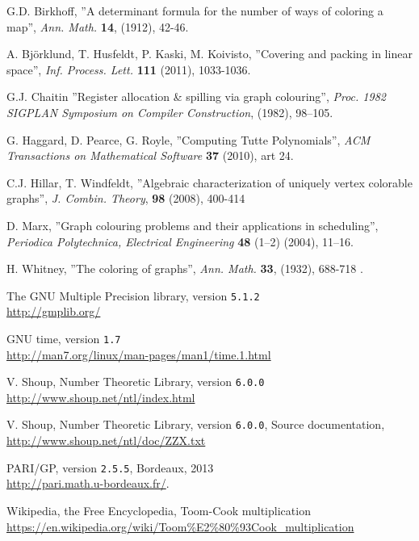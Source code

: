 \documentclass[a4paper]{article}
\newcommand{\code}{\texttt}
\begin{document}
\newpage
\begin{thebibliography}{9}
 G.D. Birkhoff, ''A determinant formula for the number of ways of coloring a map'', \textit{Ann. Math.} \textbf{14}, (1912), 42-46.

 A. Björklund, T. Husfeldt, P. Kaski, M. Koivisto, ''Covering and packing in linear space'', \textit{Inf. Process. Lett.} \textbf{111} (2011), 1033-1036.%

 G.J. Chaitin ''Register allocation \& spilling via graph colouring'', \textit{Proc. 1982 SIGPLAN Symposium on Compiler Construction}, (1982), 98–105.

 G. Haggard, D. Pearce, G. Royle, ''Computing Tutte Polynomials'', \textit{ACM Transactions on Mathematical Software} \textbf{37} (2010), art 24.

 C.J. Hillar, T. Windfeldt, ''Algebraic characterization of uniquely vertex colorable graphs'', \textit{J. Combin. Theory}, \textbf{98} (2008), 400-414

 D. Marx, ''Graph colouring problems and their applications in scheduling'', \textit{Periodica Polytechnica, Electrical Engineering} \textbf{48} (1–2) (2004), 11–16.

 H. Whitney, ''The coloring of graphs'', \textit{Ann. Math.} \textbf{33}, (1932), 688-718 .

 The GNU Multiple Precision library, version \code{5.1.2} \\ \url{http://gmplib.org/}


 GNU time, version \code{1.7} \\ \url{http://man7.org/linux/man-pages/man1/time.1.html}

 V. Shoup, Number Theoretic Library, version \code{6.0.0} \\ \url{http://www.shoup.net/ntl/index.html}

 V. Shoup, Number Theoretic Library, version \code{6.0.0}, Source documentation, \url{http://www.shoup.net/ntl/doc/ZZX.txt}

 PARI/GP, version {\tt 2.5.5}, Bordeaux, 2013 \\ \url{http://pari.math.u-bordeaux.fr/}.

 Wikipedia, the Free Encyclopedia, Toom-Cook multiplication \\ \url{https://en.wikipedia.org/wiki/Toom\%E2\%80\%93Cook_multiplication}


\end{thebibliography}
\end{document}
